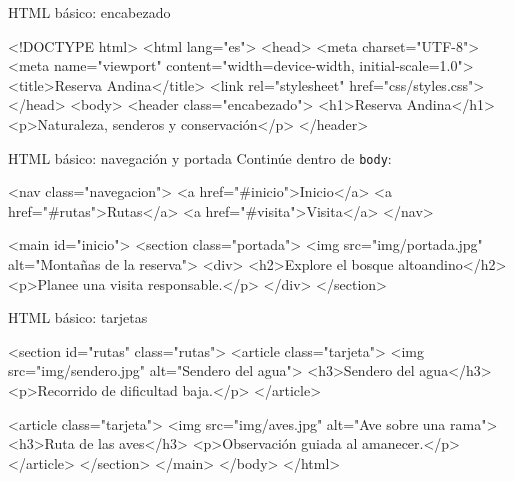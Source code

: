 \documentclass[aspectratio=169,11pt]{beamer}
\begin{document}
    \begin{frame}[fragile]{HTML básico: encabezado}
        \begin{htmlcodedark}
        <!DOCTYPE html>
        <html lang="es">
            <head>
                <meta charset="UTF-8">
                <meta name="viewport"
                content="width=device-width, initial-scale=1.0">
                <title>Reserva Andina</title>
                <link rel="stylesheet" href="css/styles.css">
            </head>
            <body>
                <header class="encabezado">
                    <h1>Reserva Andina</h1>
                    <p>Naturaleza, senderos y conservación</p>
                </header>
        \end{htmlcodedark}
    \end{frame}

    \begin{frame}[fragile]{HTML básico: navegación y portada}
        Continúe dentro de \texttt{body}:

        \begin{htmlcodedark}
            <nav class="navegacion">
                <a href="#inicio">Inicio</a>
                <a href="#rutas">Rutas</a>
                <a href="#visita">Visita</a>
            </nav>

            <main id="inicio">
                <section class="portada">
                    <img src="img/portada.jpg"
                        alt="Montañas de la reserva">
                    <div>
                        <h2>Explore el bosque altoandino</h2>
                        <p>Planee una visita responsable.</p>
                    </div>
                </section>
        \end{htmlcodedark}
    \end{frame}

    \begin{frame}[fragile]{HTML básico: tarjetas}
        \begin{htmlcodedark}
            <section id="rutas" class="rutas">
                <article class="tarjeta">
                    <img src="img/sendero.jpg" alt="Sendero del agua">
                    <h3>Sendero del agua</h3>
                    <p>Recorrido de dificultad baja.</p>
                </article>

                <article class="tarjeta">
                    <img src="img/aves.jpg" alt="Ave sobre una rama">
                    <h3>Ruta de las aves</h3>
                    <p>Observación guiada al amanecer.</p>
                </article>
            </section>
        </main>
        </body>
    </html>
        \end{htmlcodedark}
    \end{frame}
\end{document}
